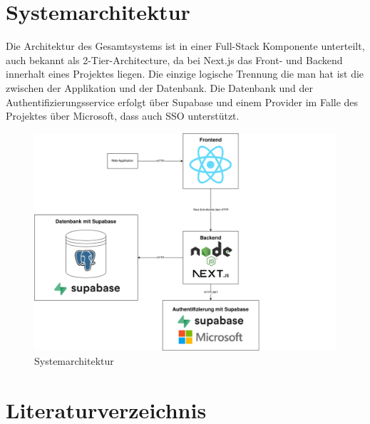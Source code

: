 \documentclass[a4paper,12pt]{article}
\begin{document}
\section{Systemarchitektur}
Die Architektur des Gesamtsystems ist in einer Full-Stack Komponente unterteilt, auch bekannt als 2-Tier-Architecture, da bei Next.js das Front- und Backend innerhalt eines Projektes liegen. Die einzige logische Trennung die man hat ist die zwischen der Applikation und der Datenbank. Die Datenbank und der Authentifizierungsservice erfolgt über Supabase und einem Provider im Falle des Projektes über Microsoft, dass auch SSO unterstützt.
\begin{figure}[h]
  \centering
  \includegraphics[width=1\textwidth]{Abbildungen/Systemarchitektur.png}
  \caption{Systemarchitektur}
  \label{fig:systemarchitektur}
\end{figure}
\newpage
\section{Literaturverzeichnis}
\end{document}
